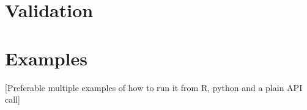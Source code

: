 \documentclass[11pt]{vantage6} %
\begin{document}

\section{Validation}



\section{Examples}
[Preferable multiple examples of how to run it from R, python and a plain API call]








\end{document}
